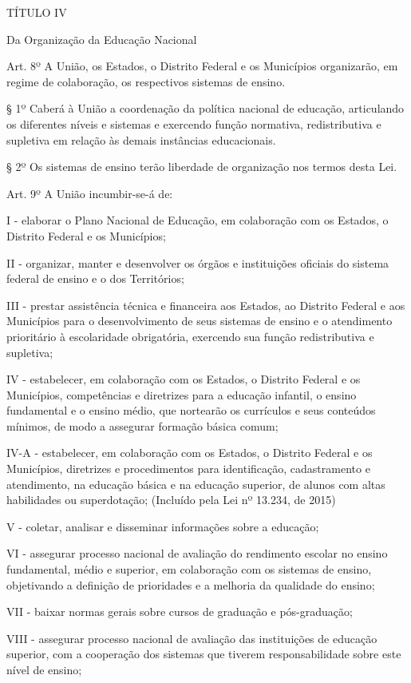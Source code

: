\documentclass[
]{book}
\begin{document}
TÍTULO IV

Da Organização da Educação Nacional

Art. 8º A União, os Estados, o Distrito Federal e os Municípios organizarão, em regime de colaboração, os respectivos sistemas de ensino.

§ 1º Caberá à União a coordenação da política nacional de educação, articulando os diferentes níveis e sistemas e exercendo função normativa, redistributiva e supletiva em relação às demais instâncias educacionais.

§ 2º Os sistemas de ensino terão liberdade de organização nos termos desta Lei.

Art. 9º A União incumbir-se-á de:

I - elaborar o Plano Nacional de Educação, em colaboração com os Estados, o Distrito Federal e os Municípios;

II - organizar, manter e desenvolver os órgãos e instituições oficiais do sistema federal de ensino e o dos Territórios;

III - prestar assistência técnica e financeira aos Estados, ao Distrito Federal e aos Municípios para o desenvolvimento de seus sistemas de ensino e o atendimento prioritário à escolaridade obrigatória, exercendo sua função redistributiva e supletiva;

IV - estabelecer, em colaboração com os Estados, o Distrito Federal e os Municípios, competências e diretrizes para a educação infantil, o ensino fundamental e o ensino médio, que nortearão os currículos e seus conteúdos mínimos, de modo a assegurar formação básica comum;

IV-A - estabelecer, em colaboração com os Estados, o Distrito Federal e os Municípios, diretrizes e procedimentos para identificação, cadastramento e atendimento, na educação básica e na educação superior, de alunos com altas habilidades ou superdotação; (Incluído pela Lei nº 13.234, de 2015)

V - coletar, analisar e disseminar informações sobre a educação;

VI - assegurar processo nacional de avaliação do rendimento escolar no ensino fundamental, médio e superior, em colaboração com os sistemas de ensino, objetivando a definição de prioridades e a melhoria da qualidade do ensino;

VII - baixar normas gerais sobre cursos de graduação e pós-graduação;

VIII - assegurar processo nacional de avaliação das instituições de educação superior, com a cooperação dos sistemas que tiverem responsabilidade sobre este nível de ensino;
\end{document}
